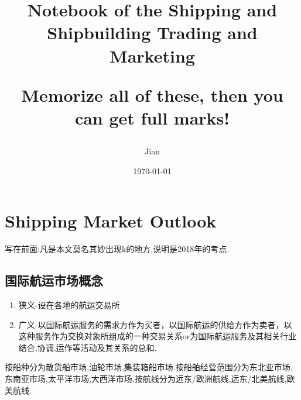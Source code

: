 \documentclass[UTF8,a4paper]{ctexart}
\title{Notebook of the Shipping and Shipbuilding Trading and Marketing \\
	\begin{large}
		 Memorize all of these, then you can get full marks! 
	 \end{large}}
\author{Jian}
\date{\today}
\begin{document}
	\maketitle
	\tableofcontents
	
	\section{Shipping Market Outlook}
	写在前面:凡是本文莫名其妙出现k的地方,说明是2018年的考点.
	\subsection{国际航运市场概念}
	\begin{enumerate}[*]
		\item 狭义-设在各地的航运交易所
		\item 广义-以国际航运服务的需求方作为买者，以国际航运的供给方作为卖者，以这种服务作为交换对象所组成的一种交易关系or为国际航运服务及其相关行业结合,协调,运作等活动及其关系的总和.
	\end{enumerate}
按船种分为散货船市场,油轮市场,集装箱船市场.按船舶经营范围分为东北亚市场,东南亚市场,太平洋市场,大西洋市场.按航线分为远东/欧洲航线,远东/北美航线,欧美航线.
\end{document}
